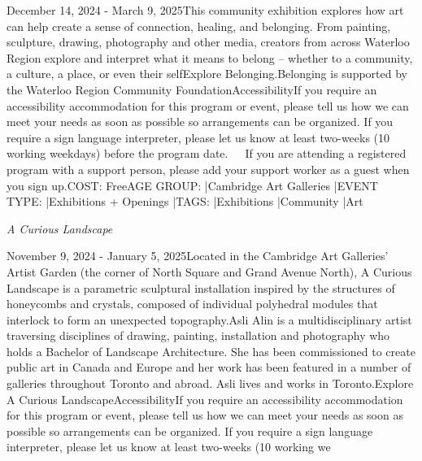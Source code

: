 \documentclass[letterpaper, 10pt]{article}
\newcommand{\subtitle}[1]{\textit{\large #1}\vspace{0.5em}}
\newcommand{\articlecontent}[1]{\small #1\vspace{1em}}
\begin{document}
\begin{multicols}{2}
{
\vspace{10px}

December 14, 2024 - March 9, 2025This community exhibition explores how art can help create a sense of connection, healing, and belonging. From painting, sculpture, drawing, photography and other media, creators from across Waterloo Region explore and interpret what it means to belong – whether to a community, a culture, a place, or even their selfExplore Belonging.Belonging is supported by the Waterloo Region Community FoundationAccessibilityIf you require an accessibility accommodation for this program or event, please tell us how we can meet your needs as soon as possible so arrangements can be organized. If you require a sign language interpreter, please let us know at least two-weeks (10 working weekdays) before the program date.   If you are attending a registered program with a support person, please add your support worker as a guest when you sign up.COST: FreeAGE GROUP: |Cambridge Art Galleries |EVENT TYPE: |Exhibitions + Openings |TAGS: |Exhibitions |Community |Art
}
\vspace{10px}

\subtitle{A Curious Landscape}

\articlecontent{

\qrcode[height=1.5cm]{https://ideaexchange.libnet.info/event/12212319}
\vspace{10px}

November 9, 2024 - January 5, 2025Located in the Cambridge Art Galleries' Artist Garden (the corner of North Square and Grand Avenue North), A Curious Landscape is a parametric sculptural installation inspired by the structures of honeycombs and crystals, composed of individual polyhedral modules that interlock to form an unexpected topography.Asli Alin is a multidisciplinary artist traversing disciplines of drawing, painting, installation and photography who holds a Bachelor of Landscape Architecture. She has been commissioned to create public art in Canada and Europe and her work has been featured in a number of galleries throughout Toronto and abroad. Asli lives and works in Toronto.Explore A Curious LandscapeAccessibilityIf you require an accessibility accommodation for this program or event, please tell us how we can meet your needs as soon as possible so arrangements can be organized. If you require a sign language interpreter, please let us know at least two-weeks (10 working we
}
\vspace{10px}


\end{multicols}
\end{document}
